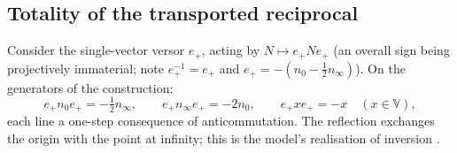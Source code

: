\documentclass[11pt]{article}
\theoremstyle{definition}
\theoremstyle{plain}
\providecommand{\nInf}{}\renewcommand{\nInf}{n_\infty}
\providecommand{\nO}{}\renewcommand{\nO}{n_0}
\begin{document}
\subsection*{Totality of the transported reciprocal}
\label{c:note.transport.setting-totality-transported-reciprocal}
Consider the single-vector versor $e_+$, acting by $N \mapsto e_+ N e_+$ (an overall sign being projectively immaterial; note $e_+^{-1} = e_+$ and $e_+ = -(\nO - \tfrac12\nInf)$). On the generators of the construction:
\begin{equation}
e_+ \nO e_+ = -\tfrac12 \nInf, \qquad e_+ \nInf e_+ = -2\nO, \qquad e_+ x e_+ = -x \quad (x \in \mathbb{V}),
\end{equation}
each line a one-step consequence of anticommutation. The reflection exchanges the origin with the point at infinity; this is the model's realisation of inversion \cite{HLR2001}.
\end{document}

